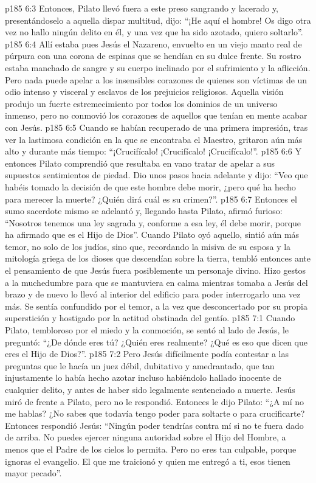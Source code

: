 \vs p185 6:3 Entonces, Pilato llevó fuera a este preso sangrando y lacerado y, presentándoselo a aquella dispar multitud, dijo: “¡He aquí el hombre! Os digo otra vez no hallo ningún delito en él, y una vez que ha sido azotado, quiero soltarlo”.
\vs p185 6:4 Allí estaba pues Jesús el Nazareno, envuelto en un viejo manto real de púrpura con una corona de espinas que se hendían en su dulce frente. Su rostro estaba manchado de sangre y su cuerpo inclinado por el sufrimiento y la aflicción. Pero nada puede apelar a los insensibles corazones de quienes son víctimas de un odio intenso y visceral y esclavos de los prejuicios religiosos. Aquella visión produjo un fuerte estremecimiento por todos los dominios de un universo inmenso, pero no conmovió los corazones de aquellos que tenían en mente acabar con Jesús.
\vs p185 6:5 Cuando se habían recuperado de una primera impresión, tras ver la lastimosa condición en la que se encontraba el Maestro, gritaron aún más alto y durante más tiempo: “¡Crucifícalo! ¡Crucifícalo! ¡Crucifícalo!”.
\vs p185 6:6 Y entonces Pilato comprendió que resultaba en vano tratar de apelar a sus supuestos sentimientos de piedad. Dio unos pasos hacia adelante y dijo: “Veo que habéis tomado la decisión de que este hombre debe morir, ¿pero qué ha hecho para merecer la muerte? ¿Quién dirá cuál es su crimen?”.
\vs p185 6:7 Entonces el sumo sacerdote mismo se adelantó y, llegando hasta Pilato, afirmó furioso: “Nosotros tenemos una ley sagrada y, conforme a esa ley, él debe morir, porque ha afirmado que es el Hijo de Dios”. Cuando Pilato oyó aquello, sintió aún más temor, no solo de los judíos, sino que, recordando la misiva de su esposa y la mitología griega de los dioses que descendían sobre la tierra, tembló entonces ante el pensamiento de que Jesús fuera posiblemente un personaje divino. Hizo gestos a la muchedumbre para que se mantuviera en calma mientras tomaba a Jesús del brazo y de nuevo lo llevó al interior del edificio para poder interrogarlo una vez más. Se sentía confundido por el temor, a la vez que desconcertado por su propia superstición y hostigado por la actitud obstinada del gentío.
\vs p185 7:1 Cuando Pilato, tembloroso por el miedo y la conmoción, se sentó al lado de Jesús, le preguntó: “¿De dónde eres tú? ¿Quién eres realmente? ¿Qué es eso que dicen que eres el Hijo de Dios?”.
\vs p185 7:2 Pero Jesús difícilmente podía contestar a las preguntas que le hacía un juez débil, dubitativo y amedrantado, que tan injustamente lo había hecho azotar incluso habiéndolo hallado inocente de cualquier delito, y antes de haber sido legalmente sentenciado a muerte. Jesús miró de frente a Pilato, pero no le respondió. Entonces le dijo Pilato: “¿A mí no me hablas? ¿No sabes que todavía tengo poder para soltarte o para crucificarte? Entonces respondió Jesús: “Ningún poder tendrías contra mí si no te fuera dado de arriba. No puedes ejercer ninguna autoridad sobre el Hijo del Hombre, a menos que el Padre de los cielos lo permita. Pero no eres tan culpable, porque ignoras el evangelio. El que me traicionó y quien me entregó a ti, esos tienen mayor pecado”.
